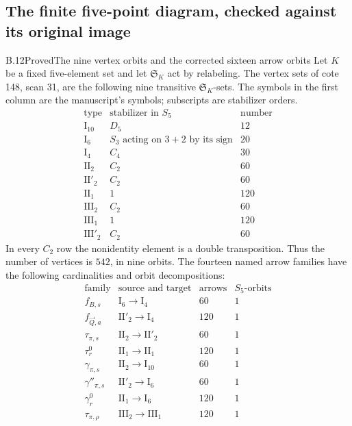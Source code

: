 \subsection{The finite five-point diagram, checked against its original image}

\begin{result}{B.12}{Proved}{The nine vertex orbits and the corrected sixteen arrow orbits}
Let $K$ be a fixed five-element set and let $\mathfrak S_K$ act by
relabeling.  The vertex sets of cote 148, scan 31, are the following
nine transitive $\mathfrak S_K$-sets.  The symbols in the first column
are the manuscript's symbols; subscripts are stabilizer orders.
\[
\begin{array}{c|c|r}
\text{type}&\text{stabilizer in }S_5&\text{number}\\ \hline
\mathrm I_{10}&D_5&12\\
\mathrm I_6&S_3\text{ acting on }3+2\text{ by its sign}&20\\
\mathrm I_4&C_4&30\\
\mathrm {II}_2&C_2&60\\
\mathrm {II}'_2&C_2&60\\
\mathrm {II}_1&1&120\\
\mathrm {III}_2&C_2&60\\
\mathrm {III}_1&1&120\\
\mathrm {III}'_2&C_2&60
\end{array}
\tag{B.16}
\]
In every $C_2$ row the nonidentity element is a double
transposition.  Thus the number of vertices is $542$, in nine
orbits.  The fourteen named arrow families have the following
cardinalities and orbit decompositions:
\[
\begin{array}{c|c|r|r}
\text{family}&\text{source and target}&\text{arrows}&S_5\text{-orbits}\\ \hline
 f_{B,s}&\mathrm I_6\to\mathrm I_4&60&1\\
 f_{\vec Q,a}&\mathrm {II}'_2\to\mathrm I_4&120&1\\
 \tau_{\pi,s}&\mathrm {II}_2\to\mathrm {II}'_2&60&1\\
 \tau_r^0&\mathrm {II}_1\to\mathrm {II}_1&120&1\\
 \gamma_{\pi,s}&\mathrm {II}_2\to\mathrm I_{10}&60&1\\
 \gamma''_{\pi,s}&\mathrm {II}'_2\to\mathrm I_6&60&1\\
 \gamma_r^0&\mathrm {II}_1\to\mathrm I_6&120&1\\
 \tau_{\pi,\rho}&\mathrm {III}_2\to\mathrm {III}_1&120&1\\

\end{array}\]
\end{result}
